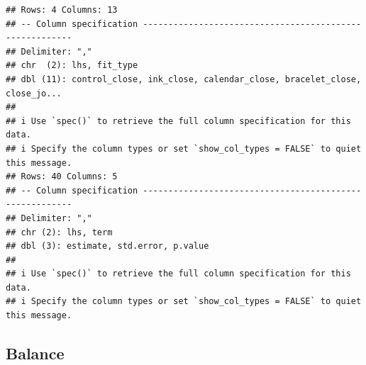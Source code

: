 \documentclass[
]{article}
\begin{document}
\begin{verbatim}
## Rows: 4 Columns: 13
## -- Column specification --------------------------------------------------------
## Delimiter: ","
## chr  (2): lhs, fit_type
## dbl (11): control_close, ink_close, calendar_close, bracelet_close, close_jo...
## 
## i Use `spec()` to retrieve the full column specification for this data.
## i Specify the column types or set `show_col_types = FALSE` to quiet this message.
## Rows: 40 Columns: 5
## -- Column specification --------------------------------------------------------
## Delimiter: ","
## chr (2): lhs, term
## dbl (3): estimate, std.error, p.value
## 
## i Use `spec()` to retrieve the full column specification for this data.
## i Specify the column types or set `show_col_types = FALSE` to quiet this message.
\end{verbatim}

\subsection{Balance}\label{balance}
\end{document}
